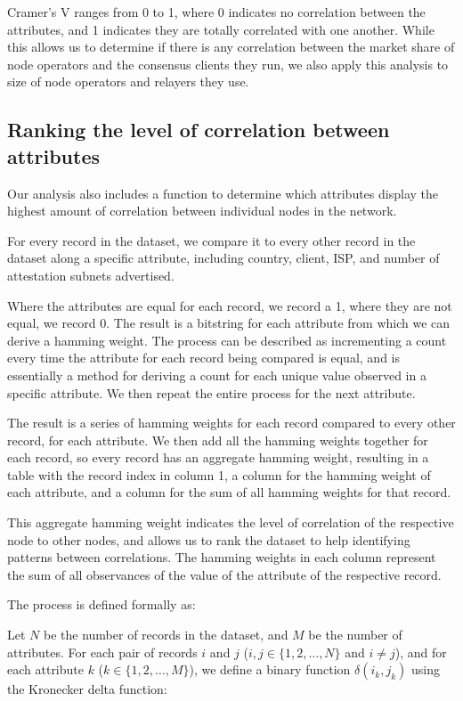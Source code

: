 \documentclass[conference]{IEEEtran}
\begin{document}
\vspace{8pt}

Cramer's V ranges from 0 to 1, where 0 indicates no correlation between the attributes, and 1 indicates they are totally correlated with one another.  While this allows us to determine if there is any correlation between the market share of node operators and the consensus clients they run, we also apply this analysis to size of node operators and relayers they use.

\subsection{Ranking the level of correlation between attributes}

Our analysis also includes a function to determine which attributes display the highest amount of correlation between individual nodes in the network.

For every record in the dataset, we compare it to every other record in the dataset along a specific attribute, including country, client, ISP, and number of attestation subnets advertised.

Where the attributes are equal for each record, we record a 1, where they are not equal, we record 0.
The result is a bitstring for each attribute from which we can derive a hamming weight.
The process can be described as incrementing a count every time the attribute for each record being compared is equal, and is essentially a method for deriving a count for each unique value observed in a specific attribute. We then repeat the entire process for the next attribute.

The result is a series of hamming weights for each record compared to every other record, for each attribute. We then add all the hamming weights together for each record, so every record has an aggregate hamming weight, resulting in a table with the record index in column 1, a column for the hamming weight of each attribute, and a column for the sum of all hamming weights for that record.

This aggregate hamming weight indicates the level of correlation of the respective node to other nodes, and allows us to rank the dataset to help identifying patterns between correlations. The hamming weights in each column represent the sum of all observances of the value of the attribute of the respective record.

The process is defined formally as:

Let \( N \) be the number of records in the dataset, and \( M \) be the number of attributes.  For each pair of records \( i \) and \( j \) (\( i, j \in \{1, 2, \ldots, N\} \) and \( i \neq j \)), and for each attribute \( k \) (\( k \in \{1, 2, \ldots, M\} \)), we define a binary function \( \delta \left( i_k,j_k \right) \) using the Kronecker delta function:
\end{document}
